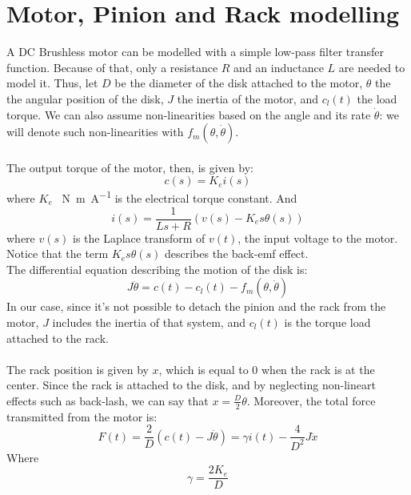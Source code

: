 \section{Motor, Pinion and Rack modelling} 
A DC Brushless motor can be modelled with a simple low-pass filter transfer function. Because of that, only a resistance $R$ and an inductance $L$ are needed to model it. Thus, let $D$ be the diameter of the disk attached to the motor, $\theta$ the the angular position of the disk, $J$ the inertia of the motor, and $c_{l}(t)$ the load torque. We can also assume non-linearities based on the angle and its rate $\dot{\theta}$:  we will denote such non-linearities with $f_{m}(\theta,\dot{\theta})$.\\ \\
 The output torque of the motor, then, is  given by:
 \begin{equation}
 c(s) = K_e i(s)
 \end{equation}
 where $K_e$ \SI{}{\newton \metre \per \ampere} is the electrical torque constant.
And
\begin{equation}
i(s)=\frac{1}{Ls+R} (v(s)-K_{e}s \theta(s))
\end{equation}
where $v(s)$ is the Laplace transform of $v(t)$, the input voltage to the motor. Notice that the term $K_{e}s \theta(s)$ describes the back-emf effect. \\
The differential equation describing the motion of the disk is:
\begin{equation}J\ddot{\theta}=c(t)-c_{l}(t) -f_{m}(\theta,\dot{\theta})
\end{equation}
In our case, since it's not possible to detach the pinion and the rack from the motor, $J$ includes the inertia of that system, and $c_{l}(t)$ is the torque load attached to the rack. 
\\ \\
The rack position is given by $x$, which is equal to $0$ when the rack is at the center. Since the rack is attached to the disk, and by neglecting non-lineart effects such as back-lash, we can say that $x=\frac{D}{2}\theta $. Moreover,  the total force transmitted from the motor is:
\begin{equation}F(t)  =  \frac{2}{D} (c(t)-J\ddot{\theta}) = \gamma i(t) - \frac{4}{D^2}J \ddot{x}
\end{equation}
Where 
\begin{equation}\gamma = \frac{2K_e}{D}\end{equation}

